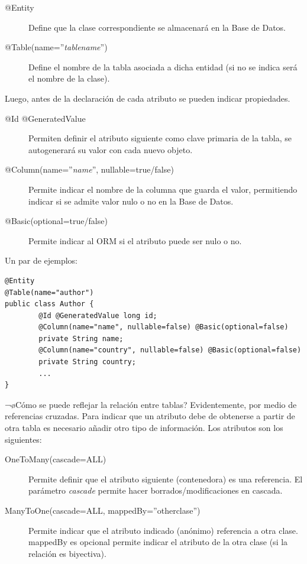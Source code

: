 \documentclass[11pt]{article}
\begin{document}
\begin{description}
\item[@Entity] Define que la clase correspondiente se almacenará en la Base de Datos.
\item[@Table(name=''\emph{tablename}'')] Define el nombre de la tabla asociada a dicha entidad (si no se indica
  será el nombre de la clase).
\end{description}


Luego, antes de la declaración de cada atributo se pueden indicar propiedades.




\begin{description}
\item[@Id @GeneratedValue] Permiten definir el atributo siguiente como clave primaria de la tabla, se
     autogenerará su valor con cada nuevo objeto.
\item[@Column(name=''\emph{name}'', nullable=true/false)] Permite indicar el nombre de la columna que
     guarda el valor, permitiendo indicar si se admite valor nulo o no en la Base de Datos.
\item[@Basic(optional=true/false)] Permite indicar al ORM si el atributo puede ser nulo o no.
\end{description}


Un par de ejemplos:


\begin{lstlisting}
@Entity
@Table(name="author")
public class Author {
        @Id @GeneratedValue long id;
        @Column(name="name", nullable=false) @Basic(optional=false)
        private String name;
        @Column(name="country", nullable=false) @Basic(optional=false)
        private String country;
        ...
}
\end{lstlisting}




¬øCómo se puede reflejar la relación entre tablas? Evidentemente, por medio de referencias cruzadas. Para
indicar que un atributo debe de obtenerse a partir de otra tabla es necesario añadir otro tipo de información. 
Los atributos son los siguientes:




\begin{description}
\item[OneToMany(cascade=ALL)] Permite definir que el atributo siguiente (contenedora) es una
     referencia. El parámetro \emph{cascade} permite hacer borrados/modificaciones en cascada.
\item[ManyToOne(cascade=ALL, mappedBy=''otherclase'')] Permite indicar que el atributo indicado
     (anónimo) referencia a otra clase. mappedBy es opcional permite indicar el atributo de la otra
     clase (si la relación es biyectiva).
\end{description}
\end{document}
